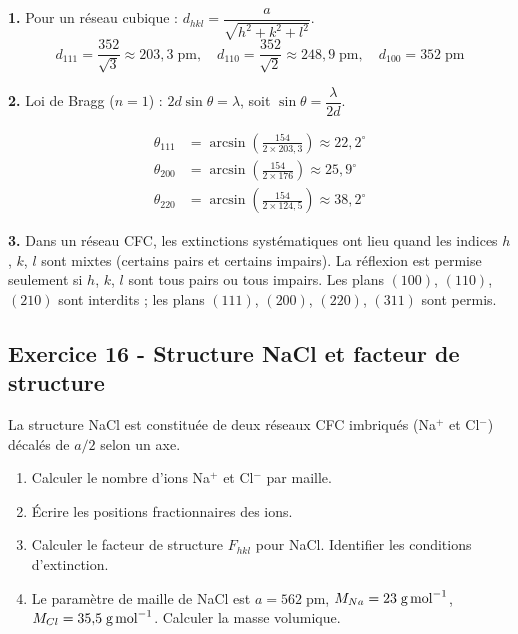 \documentclass[12pt,a4paper]{article}
\begin{document}
\begin{boitecorrige}
\textbf{1.} Pour un réseau cubique : $d_{hkl} = \dfrac{a}{\sqrt{h^2+k^2+l^2}}$.
\[
d_{111} = \frac{352}{\sqrt{3}} \approx 203{,}3\;\text{pm}, \quad d_{110} = \frac{352}{\sqrt{2}} \approx 248{,}9\;\text{pm}, \quad d_{100} = 352\;\text{pm}
\]

\textbf{2.} Loi de Bragg ($n=1$) : $2d\sin\theta = \lambda$, soit $\sin\theta = \dfrac{\lambda}{2d}$.

\begin{align*}
\theta_{111} &= \arcsin\!\left(\frac{154}{2\times203{,}3}\right) \approx 22{,}2^\circ \\
\theta_{200} &= \arcsin\!\left(\frac{154}{2\times176}\right) \approx 25{,}9^\circ \\
\theta_{220} &= \arcsin\!\left(\frac{154}{2\times124{,}5}\right) \approx 38{,}2^\circ
\end{align*}

\textbf{3.} Dans un réseau CFC, les extinctions systématiques ont lieu quand les indices $h$, $k$, $l$ sont mixtes (certains pairs et certains impairs). La réflexion est permise seulement si $h$, $k$, $l$ sont tous pairs ou tous impairs. Les plans $(100)$, $(110)$, $(210)$ sont interdits ; les plans $(111)$, $(200)$, $(220)$, $(311)$ sont permis.
\end{boitecorrige}

\subsection*{Exercice 16 - Structure NaCl et facteur de structure \niveau{\difficile}}

\begin{boiteexercice}
La structure NaCl est constituée de deux réseaux CFC imbriqués (Na$^+$ et Cl$^-$) décalés de $a/2$ selon un axe.
\begin{enumerate}
  \item Calculer le nombre d'ions Na$^+$ et Cl$^-$ par maille.
  \item Écrire les positions fractionnaires des ions.
  \item Calculer le facteur de structure $F_{hkl}$ pour NaCl. Identifier les conditions d'extinction.
  \item Le paramètre de maille de NaCl est $a = 562\;\text{pm}$, $M_{Na} = 23\;\text{g\,mol}^{-1}$, $M_{Cl} = 35{,}5\;\text{g\,mol}^{-1}$. Calculer la masse volumique.
\end{enumerate}
\end{boiteexercice}
\end{document}

